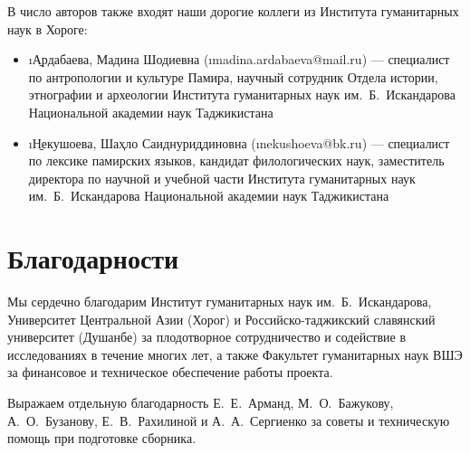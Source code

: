 В число авторов также входят наши дорогие коллеги из Института гуманитарных наук в Хороге:

{\small
\begin{itemize}
  \item \i{\b{Ардабаева}, Мадина Шодиевна} (\i{madina.ardabaeva@mail.ru}) — специалист по антропологии и культуре Памира, научный сотрудник Отдела истории, этнографии и археологии Института гуманитарных наук им.~Б.~Искандарова Национальной академии наук Таджикистана
  \item \i{\b{Некушоева}, Шаҳло Саиднуриддиновна} (\i{nekushoeva@bk.ru}) — специалист по лексике памирских языков, кандидат филологических наук, заместитель директора по научной и учебной части Института гуманитарных наук им.~Б.~Искандарова Национальной академии наук Таджикистана
\end{itemize}}

\section*{Благодарности}

Мы сердечно благодарим Институт гуманитарных наук им.~Б.~Искандарова, Университет Центральной Азии (Хорог) и Российско-таджикский славянский университет (Душанбе) за плодотворное сотрудничество и содействие в исследованиях в течение многих лет, а также Факультет гуманитарных наук ВШЭ за финансовое и техническое обеспечение работы проекта.

Выражаем отдельную благодарность Е.~Е.~Арманд, М.~О.~Бажукову, А.~О.~Бузанову, Е.~В.~Рахилиной и А.~А.~Сергиенко за советы и техническую помощь при подготовке сборника.
